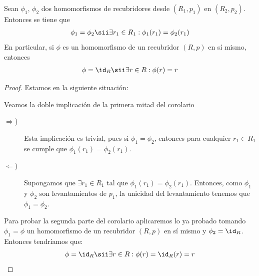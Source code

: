 \begin{coro}\label{coro-2.3.1}
    Sean $\phi_1$, $\phi_2$ dos homomorfismos de recubridores desde $(R_1,p_1)$ en $(R_2,p_2)$. Entonces se tiene que 
    \begin{gather*}
        \phi_1 = \phi_2 \sii \exists r_1\in R_1 : \phi_1(r_1) = \phi_2(r_1)
    \end{gather*}
    En particular, si $\phi$ es un homomorfismo de un recubridor $(R,p)$ en sí mismo, entonces
    \begin{gather*}
        \phi = \id_{R} \sii \exists r \in R : \phi(r)=r
    \end{gather*}

    \begin{proof}
        Estamos en la siguiente situación:
        \begin{center}
        \end{center}

        Veamos la doble implicación de la primera mitad del corolario
        \begin{description}
            \item[$\Longrightarrow$)] Esta implicación es trivial, pues si $\phi_1=\phi_2$, entonces para cualquier $r_1\in R_1$ se cumple que $\phi_1(r_1)=\phi_2(r_1)$.
            \item[$\Longleftarrow$)] Supongamos que $\exists r_1\in R_1$ tal que $\phi_1(r_1)=\phi_2(r_1)$. Entonces, como $\phi_1$ y $\phi_2$ son levantamientos de $p_1$, la unicidad del levantamiento tenemos que $\phi_1=\phi_2$.
        \end{description}

        Para probar la segunda parte del corolario aplicaremos lo ya probado tomando $\phi_1=\phi$ un homomorfismo de un recubridor $(R,p)$ en sí mismo y $\phi_2=\id_R$. Entonces tendríamos que: 
        \begin{gather*}
            \phi = \id_{R} \sii \exists r\in R : \phi(r)=\id_{R}(r)=r
        \end{gather*}
    \end{proof}
\end{coro}


